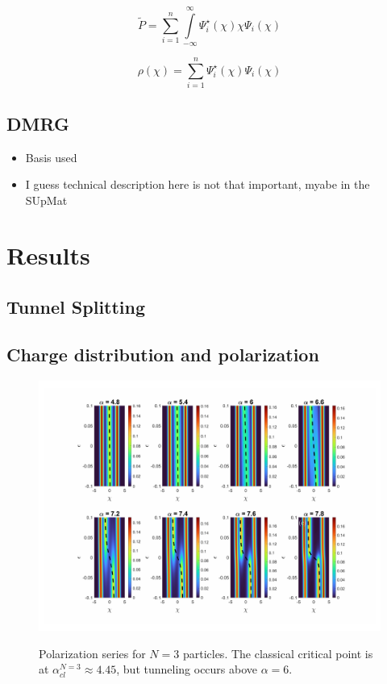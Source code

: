 \documentclass[prb,twocolumn,showpacs,preprintnumbers,amsmath,amssymb, superscriptaddress]{revtex4-2}
\newcommand{\1}{{1\hspace*{-0.5ex} \textrm{l} \hspace*{0.5ex}}}
\begin{document}
\begin{equation}
\tilde{P} = \sum_{i=1}^n \int\limits_{-\infty}^{\infty} \Psi^\star_i (\chi) \chi \Psi_i(\chi)
\end{equation}

\begin{equation}
\rho(\chi) = \sum_{i=1}^n \Psi^\star_i (\chi) \Psi_i(\chi)
\end{equation}
\subsection{DMRG}
\begin{itemize}
\item Basis used
\item I guess technical description here is not that important, myabe in the SUpMat
\end{itemize}


\section{Results}
\subsection{Tunnel Splitting}

\subsection{Charge distribution and polarization}
\begin{figure}[h!]
    \begin{center}
     \includegraphics[width=2\columnwidth]{SupMatFig_DensitySeries}
     \label{fig:experimental_setup}
     \caption{Polarization series for $N = 3$ particles. The classical critical point is at $\alpha_{cl}^{N=3} \approx 4.45$, but tunneling occurs above $\alpha = 6$.}
     
    \end{center}
     \end{figure}
\end{document}
